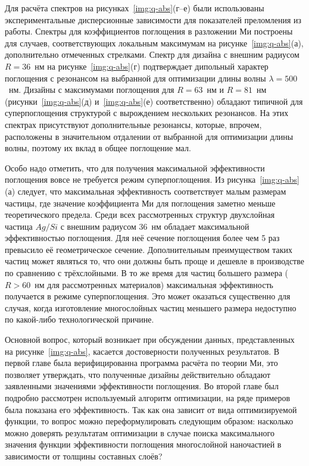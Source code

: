 Для расчёта спектров на рисунках~\ref{img:q-abs}(г--е) были
использованы экспериментальные дисперсионные зависимости для
показателей преломления из работы\cite{palik-1997}. Спектры для
коэффициентов поглощения в разложении Ми построены для случаев,
соответствующих локальным максимумам на рисунке~\ref{img:q-abs}(а),
дополнительно отмеченных стрелками.  Спектр для дизайна с внешним
радиусом $R=36$~нм на рисунке~\ref{img:q-abs}(г) подтверждает
дипольный характер поглощения с резонансом на выбранной для
оптимизации длины волны $\lambda=500$~нм.  Дизайны с
максимумами поглощения для $R=63$~нм и $R=81$~нм
(рисунки~\ref{img:q-abs}(д) и~\ref{img:q-abs}(е) соответственно)
обладают типичной для суперпоглощения структурой с вырождением
нескольких резонансов. На этих спектрах присутствуют дополнительные
резонансы, которые, впрочем, расположены в значительном отдалении от
выбранной для оптимизации длины волны, поэтому их вклад в общее
поглощение мал.

Особо надо отметить, что для получения максимальной эффективности
поглощения вовсе не требуется режим суперпоглощения.  Из
рисунка~\ref{img:q-abs}(а) следует, что максимальная эффективность
соответствует малым размерам частицы, где значение коэффициента Ми для
поглощения заметно меньше теоретического предела.  Среди всех
рассмотренных структур двухслойная частица $Ag/Si$ с внешним радиусом
36~нм обладает максимальной эффективностью поглощения.  Для неё
сечение поглощения более чем 5 раз превысило её геометрическое
сечение. Дополнительным преимуществом таких частиц может являться то,
что они должны быть проще и дешевле в производстве по сравнению с
трёхслойными.  В то же время для частиц большего размера ($R>60$~нм
для рассмотренных материалов) максимальная эффективность получается в
режиме суперпоглощения.  Это может оказаться существенно для случая,
когда изготовление многослойных частиц меньшего размера недоступно по
какой-либо технологической причине.

Основной вопрос, который возникает при обсуждении данных,
представленных на рисунке~\ref{img:q-abs}, касается достоверности
полученных результатов.  В первой главе была верифицированна программа
расчёта по теории Ми, это позволяет утверждать, что полученные дизайны
действительно обладают заявленными значениями эффективности
поглощения.  Во второй главе был подробно рассмотрен используемый
алгоритм оптимизации, на ряде примеров была показана его
эффективность.  Так как она зависит от вида оптимизируемой функции, то
вопрос можно переформулировать следующим образом: насколько можно
доверять результатам оптимизации в случае поиска максимального
значения функции эффективности поглощения многослойной наночастией в
зависимости от толщины составных слоёв?

